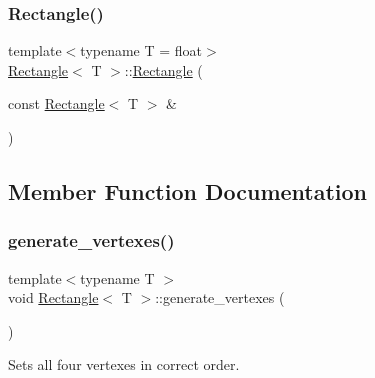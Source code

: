 \mbox{\label{classRectangle_acf27dae8f7c9a022428bda816903db2e}} 
\subsubsection{\texorpdfstring{Rectangle()}{Rectangle()}\hspace{0.1cm}{\footnotesize\ttfamily [3/3]}}
{\footnotesize\ttfamily template$<$typename T  = float$>$ \\
\mbox{\hyperlink{classRectangle}{Rectangle}}$<$ T $>$\+::\mbox{\hyperlink{classRectangle}{Rectangle}} (\begin{DoxyParamCaption}\item[{const \mbox{\hyperlink{classRectangle}{Rectangle}}$<$ T $>$ \&}]{ }\end{DoxyParamCaption})\hspace{0.3cm}{\ttfamily [default]}}



\subsection{Member Function Documentation}
\mbox{\label{classRectangle_a0f9d67fb9478883f067c47cdc7bf7bca}} 
\subsubsection{\texorpdfstring{generate\+\_\+vertexes()}{generate\_vertexes()}}
{\footnotesize\ttfamily template$<$typename T $>$ \\
void \mbox{\hyperlink{classRectangle}{Rectangle}}$<$ T $>$\+::generate\+\_\+vertexes (\begin{DoxyParamCaption}{ }\end{DoxyParamCaption})\hspace{0.3cm}{\ttfamily [private]}}



Sets all four vertexes in correct order. 

\mbox{\label{classRectangle_ab53b617f14505834f525ec614ccce5c8}} 
